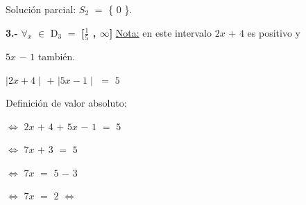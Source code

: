 \documentclass[12pt]{article}
\newenvironment{MyColorPar}[1]{%
    \leavevmode\color{#1}\ignorespaces%
}{%
}%
\begin{document}
\begin{MyColorPar}{verde_manzana}
Solución parcial: $S_{2}$ $=$ {\Large{\{ $0$ \}}}.
\end{MyColorPar} \vspace{0.5cm}


{\bfseries{3.-}} \hspace{0.2cm} $\forall$$_{x}$ $\in$ D$_{3}$ $=$ {\textcolor{wisteria}{{\bfseries{[{\Large{$\frac{1}{5}$}} {\Large{,}} $\infty$]}}}} {\textcolor{palatinateblue}{{\underline{Nota:}} en este intervalo $2x$ $+$ $4$ es {\textcolor{verde_manzana}{positivo}} y}} 

{\textcolor{palatinateblue}{$5x$ $-$ $1$ también.}} \vspace{0.5cm} 

\begin{center}
    
$\mid 2x + 4 \mid$ $+$ $\mid 5x - 1\mid$ $=$ $5$ 
\end{center}

\begin{MyColorPar}{palatinateblue}
Definición de valor absoluto:
\end{MyColorPar}

\hspace{3cm} $\Longleftrightarrow$ \hspace{0.2cm} $2x$ $+$ $4$ $+$ $5x$ $-$ $1$ $=$ $5$ \vspace{0.2cm}

\hspace{3cm} $\Longleftrightarrow$ \hspace{0.2cm} $7x$ $+$ $3$ $=$ $5$ \vspace{0.2cm}

\hspace{3cm} $\Longleftrightarrow$ \hspace{0.2cm} $7x$ $=$ $5$ $-$ $3$ \vspace{0.2cm}

\hspace{3cm} $\Longleftrightarrow$ \hspace{0.2cm} $7x$ $=$ $2$ \hspace{0.2cm} $\Longleftrightarrow$ \hspace{0.2cm}  \vspace{0.2cm}
\end{document}
